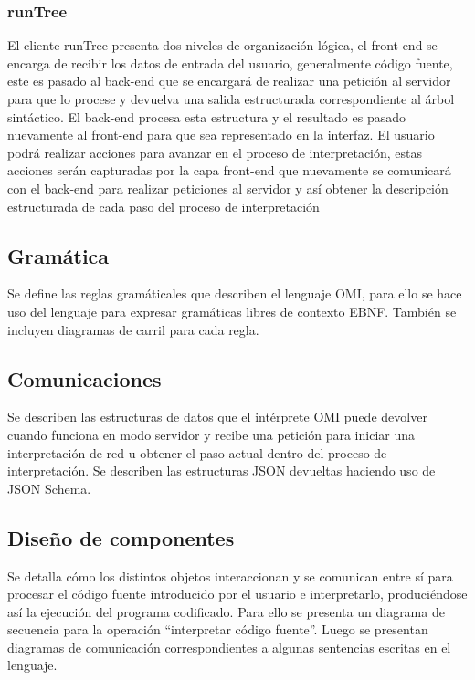 \subsubsection{runTree}
El cliente runTree presenta dos niveles de organización lógica, el front-end se encarga de recibir los datos de entrada del usuario, generalmente código fuente, este es pasado al back-end que se encargará de realizar 
una petición al servidor para que lo procese y devuelva una salida estructurada correspondiente al árbol sintáctico. El back-end procesa esta estructura y el resultado es pasado nuevamente al front-end para que 
sea representado en la interfaz. El usuario podrá realizar acciones para avanzar en el proceso de interpretación, estas acciones serán capturadas por la capa front-end que nuevamente se comunicará con el back-end para 
realizar peticiones al servidor y así obtener la descripción estructurada de cada paso del proceso de interpretación

\subsection{Gramática}
Se define las reglas gramáticales que describen el lenguaje OMI, para ello se hace uso del lenguaje para expresar gramáticas libres de contexto EBNF. También se incluyen diagramas de carril para cada regla. 

\subsection{Comunicaciones}
Se describen las estructuras de datos que el intérprete OMI puede devolver cuando funciona en modo servidor y recibe una petición para iniciar una interpretación de red u obtener el paso actual dentro 
del proceso de interpretación. Se describen las estructuras JSON devueltas haciendo uso de JSON Schema.

\subsection{Diseño de componentes}
Se detalla cómo los distintos objetos interaccionan y se comunican entre sí para
procesar el código fuente introducido por el usuario e interpretarlo, produciéndose así la ejecución del programa codificado. 
Para ello se presenta un diagrama de secuencia para la operación ``interpretar código fuente''. Luego se presentan diagramas de 
comunicación correspondientes a algunas sentencias escritas en el lenguaje.

